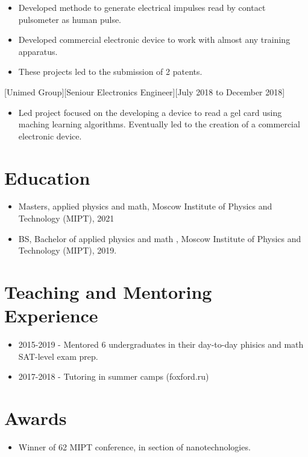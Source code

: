 \documentclass{article}
\begin{document}
\begin{itemize}
\item Developed methode to generate electrical impulses read by contact pulsometer as human pulse.
\item Developed commercial electronic device to work with almost any training apparatus. 
\item These projects led to the submission of 2 patents.
\end{itemize}

[Unimed Group][Seniour Electronics Engineer][July 2018 to December 2018]

\begin{itemize}
\item Led project focused on the developing a device to read a gel card using maching learning algorithms. Eventually led to the creation of a commercial electronic device.
\end{itemize}

 
\section{Education}

\begin{itemize}
\item Masters, applied physics and math, Moscow Institute of Physics and Technology (MIPT), 2021  
\item BS, Bachelor of applied physics and math , Moscow Institute of Physics and Technology (MIPT), 2019.
\end{itemize}
 
\section{Teaching and Mentoring Experience }
\begin{itemize}
\item 2015-2019 - Mentored 6 undergraduates in their day-to-day phisics and math SAT-level exam prep.
\item 2017-2018 - Tutoring in summer camps (foxford.ru)
\end{itemize}

\section{Awards}
\begin{itemize}
\item Winner of 62 MIPT conference, in section of nanotechnologies.
\end{itemize}
\end{document}

